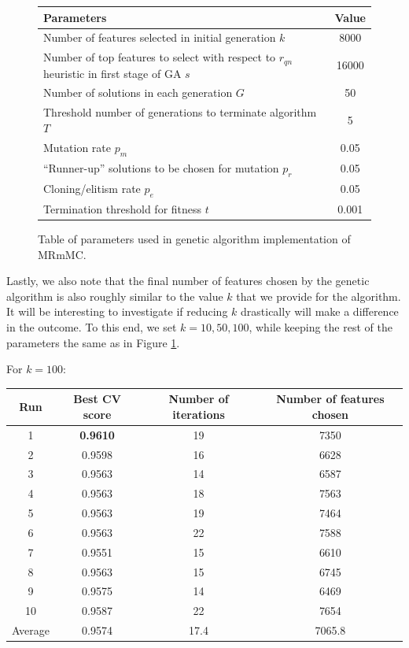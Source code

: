 \documentclass[12pt, twoside, a4paper]{report}
\begin{document}
\begin{figure}
\begin{center}
    \begin{tabular}{| p{12cm} | c |} \hline
    Parameters & Value \\ \hline \hline
    Number of features selected in initial generation $k$ & 8000 \\ \hline
    Number of top features to select with respect to $r_{qn}$ heuristic in first stage of GA $s$ & 16000 \\ \hline
    Number of solutions in each generation $G$ & 50 \\ \hline
    Threshold number of generations to terminate algorithm $T$ & 5 \\ \hline
    Mutation rate $p_m$ &  0.05 \\ \hline
    ``Runner-up'' solutions to be chosen for mutation $p_r$ & 0.05 \\ \hline
    Cloning/elitism rate $p_e$ & 0.05 \\ \hline
    Termination threshold for fitness $t$ & 0.001 \\ \hline
    \end{tabular}
\end{center}
\caption{Table of parameters used in genetic algorithm implementation of MRmMC.}
\label{ga:mrmmc:params_1}
\end{figure}

Lastly, we also note that the final number of features chosen by the genetic algorithm is also roughly similar to the value $k$ that we provide for the algorithm. It will be interesting to investigate if reducing $k$ drastically will make a difference in the outcome. To this end, we set $k=10,50,100$, while keeping the rest of the parameters the same as in Figure \ref{ga:mrmmc:params_1}.

For $k=100$:

\begin{center}
    \begin{tabular}{| c | c | c | c | } \hline
    Run & Best CV score & Number of iterations & Number of features chosen \\ \hline \hline
    1 & \textbf{0.9610} & 19 & 7350 \\ \hline
	2 & 0.9598  & 16 & 6628 \\ \hline
	3 & 0.9563 & 14 & 6587 \\ \hline
	4 & 0.9563 & 18 & 7563 \\ \hline
	5 & 0.9563 & 19 & 7464 \\ \hline
	6 & 0.9563 & 22 & 7588 \\ \hline
	7 & 0.9551 & 15 & 6610 \\ \hline
	8 & 0.9563 & 15 & 6745 \\ \hline
	9 & 0.9575 & 14 & 6469 \\ \hline
	10 & 0.9587 & 22 & 7654 \\ \hline
	Average & 0.9574 & 17.4 & 7065.8 \\ \hline
    \end{tabular}
\end{center}
\end{document}
